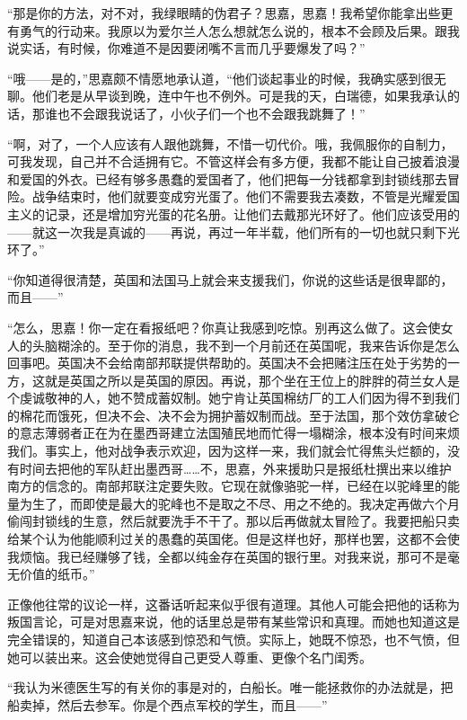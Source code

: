 \par “那是你的方法，对不对，我绿眼睛的伪君子？思嘉，思嘉！我希望你能拿出些更有勇气的行动来。我原以为爱尔兰人怎么想就怎么说的，根本不会顾及后果。跟我说实话，有时候，你难道不是因要闭嘴不言而几乎要爆发了吗？”
\par “哦——是的，”思嘉颇不情愿地承认道，“他们谈起事业的时候，我确实感到很无聊。他们老是从早谈到晚，连中午也不例外。可是我的天，白瑞德，如果我承认的话，那谁也不会跟我说话了，小伙子们一个也不会跟我跳舞了！”
\par “啊，对了，一个人应该有人跟他跳舞，不惜一切代价。哦，我佩服你的自制力，可我发现，自己并不合适拥有它。不管这样会有多方便，我都不能让自己披着浪漫和爱国的外衣。已经有够多愚蠢的爱国者了，他们把每一分钱都拿到封锁线那去冒险。战争结束时，他们就要变成穷光蛋了。他们不需要我去凑数，不管是光耀爱国主义的记录，还是增加穷光蛋的花名册。让他们去戴那光环好了。他们应该受用的——就这一次我是真诚的——再说，再过一年半载，他们所有的一切也就只剩下光环了。”
\par “你知道得很清楚，英国和法国马上就会来支援我们，你说的这些话是很卑鄙的，而且——”
\par “怎么，思嘉！你一定在看报纸吧？你真让我感到吃惊。别再这么做了。这会使女人的头脑糊涂的。至于你的消息，我不到一个月前还在英国呢，我来告诉你是怎么回事吧。英国决不会给南部邦联提供帮助的。英国决不会把赌注压在处于劣势的一方，这就是英国之所以是英国的原因。再说，那个坐在王位上的胖胖的荷兰女人是个虔诚敬神的人，她不赞成蓄奴制。她宁肯让英国棉纺厂的工人们因为得不到我们的棉花而饿死，但决不会、决不会为拥护蓄奴制而战。至于法国，那个效仿拿破仑的意志薄弱者正在为在墨西哥建立法国殖民地而忙得一塌糊涂，根本没有时间来烦我们。事实上，他对战争表示欢迎，因为这样一来，我们就会忙得焦头烂额的，没有时间去把他的军队赶出墨西哥……不，思嘉，外来援助只是报纸杜撰出来以维护南方的信念的。南部邦联注定要失败。它现在就像骆驼一样，已经在以驼峰里的能量为生了，而即使是最大的驼峰也不是取之不尽、用之不绝的。我决定再做六个月偷闯封锁线的生意，然后就要洗手不干了。那以后再做就太冒险了。我要把船只卖给某个认为他能顺利过关的愚蠢的英国佬。但是这样也好，那样也罢，这都不会使我烦恼。我已经赚够了钱，全都以纯金存在英国的银行里。对我来说，那可不是毫无价值的纸币。”
\par 正像他往常的议论一样，这番话听起来似乎很有道理。其他人可能会把他的话称为叛国言论，可是对思嘉来说，他的话里总是带有某些常识和真理。而她也知道这是完全错误的，知道自己本该感到惊恐和气愤。实际上，她既不惊恐，也不气愤，但她可以装出来。这会使她觉得自己更受人尊重、更像个名门闺秀。
\par “我认为米德医生写的有关你的事是对的，白船长。唯一能拯救你的办法就是，把船卖掉，然后去参军。你是个西点军校的学生，而且——”
